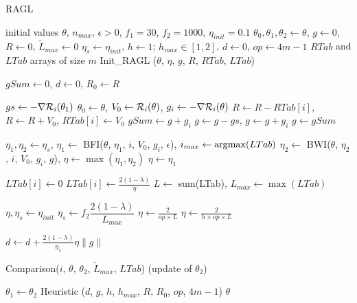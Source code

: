\begin{algorithm}[h!]
	\caption{RAGL}
	\label{algo_RAGL}
	\begin{algorithmic}[1]
		\REQUIRE initial values $\theta$, $n_{max}$, $\epsilon>0$, $f_1=30$, $f_2=1000$, $\eta_{init}=0.1$ 
		\STATE $\theta_0, \theta_1, \theta_2 \leftarrow \theta$, $g \leftarrow 0$, $R \leftarrow 0$, $\tilde{L}_{max} \leftarrow 0$
		\STATE $\eta_s \leftarrow \eta_{init}$, $h\leftarrow 1$; $h_{max}\in [1,2]$, $d\leftarrow 0$, $op\leftarrow 4m-1$
		\STATE $RTab$ and $LTab$ arrays of size $m$
		\STATE Init\_RAGL ($\theta$, $\eta$, $g$, $R$, $RTab$, $LTab$)
		
		\STATE $gSum \leftarrow 0$, $d\leftarrow 0$, $R_0 \leftarrow R$
		
		
		\STATE $gs \leftarrow -\nabla \mathcal{R}_i(\theta_1)$
		\ENDIF
		\STATE $\theta_0 \leftarrow \theta$, $V_0 \leftarrow \mathcal{R}_i(\theta)$, $g_i \leftarrow -\nabla \mathcal{R}_i(\theta)$
		\STATE $R \leftarrow R-RTab[i]$, $R \leftarrow R+V_0$, $RTab[i] \leftarrow V_0$
		\STATE $gSum \leftarrow g+g_i$
		\STATE $g \leftarrow g-gs$, $g \leftarrow g+g_i$
		\ELSE
		\STATE $g \leftarrow gSum$
		\ENDIF
		
		\STATE $\eta_1, \eta_2 \leftarrow \eta_s$, $\eta_1 \leftarrow$ BFI($\theta$, $\eta_1$, $i$, $V_0$, $g_i$, $\epsilon$), $i_{max} \leftarrow \operatorname*{\arg\!\max}(LTab)$
		\STATE $\eta_2 \leftarrow$ BWI($\theta$, $\eta_2$, $i$, $V_0$, $g_i$, $g$), $\eta \leftarrow \max(\eta_1,\eta_2)$
		\ELSE
		\STATE $\eta \leftarrow \eta_1$
		\ENDIF
		
		\STATE $LTab[i] \leftarrow 0$
		\ELSE
		\STATE $LTab[i] \leftarrow \frac{2(1-\lambda)}{\eta}$
		\ENDIF
		\STATE $L \leftarrow$ sum(LTab), $L_{max} \leftarrow \max(LTab)$
		
		\STATE $\eta,\eta_s \leftarrow \eta_{init}$
		\ELSE
		\STATE $\eta_s \leftarrow f_2\dfrac{2(1-\lambda)}{L_{max}}$
		\STATE $\eta \leftarrow \frac{2}{op \times L}$
		\ELSE
		\STATE $\eta \leftarrow \frac{2}{h \times op \times L}$
		\ENDIF
		\ENDIF
		
		\STATE $d \leftarrow d+\frac{2(1-\lambda)}{\eta_1}\eta \|g\|$
		\ENDIF
		
		\STATE Comparison($i$, $\theta$, $\theta_2$, $\tilde{L}_{max}$, $LTab$) (update of $\theta_2$)
		
		\ENDFOR
		\STATE $\theta_1 \leftarrow \theta_2$
		\STATE Heuristic ($d$, $g$, $h$, $h_{max}$, $R$, $R_0$, $op$, $4m-1$)
		\ENDWHILE
		\RETURN $\theta$
	\end{algorithmic}
\end{algorithm}

